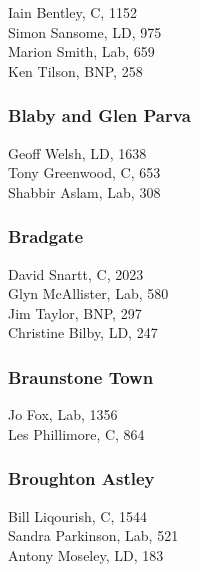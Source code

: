 \documentclass[a4paper,openany,10pt]{book}
\begin{document}
Iain Bentley, C, 1152\\
Simon Sansome, LD, 975\\
Marion Smith, Lab, 659\\
Ken Tilson, BNP, 258\\


\subsubsection*{Blaby and Glen Parva}



Geoff Welsh, LD, 1638\\
Tony Greenwood, C, 653\\
Shabbir Aslam, Lab, 308\\


\subsubsection*{Bradgate}



David Snartt, C, 2023\\
Glyn McAllister, Lab, 580\\
Jim Taylor, BNP, 297\\
Christine Bilby, LD, 247\\


\subsubsection*{Braunstone Town}



Jo Fox, Lab, 1356\\
Les Phillimore, C, 864\\


\subsubsection*{Broughton Astley}



Bill Liqourish, C, 1544\\
Sandra Parkinson, Lab, 521\\
Antony Moseley, LD, 183\\
\end{document}
